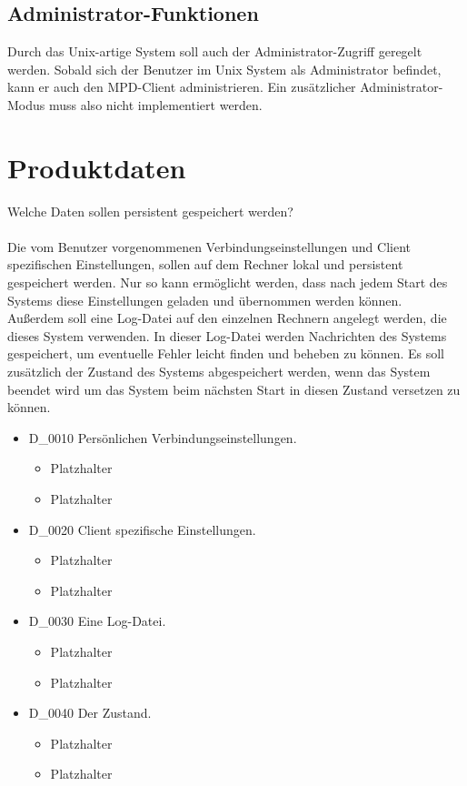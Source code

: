 \subsection{Administrator-Funktionen}
Durch das Unix-artige System soll auch der Administrator-Zugriff geregelt werden. Sobald sich der Benutzer im Unix System
als Administrator befindet, kann er auch den MPD-Client administrieren. Ein zusätzlicher Administrator-Modus muss also
nicht implementiert werden.
\section{Produktdaten}
Welche Daten sollen persistent gespeichert werden?\ \\ \\
Die vom Benutzer vorgenommenen Verbindungseinstellungen und Client spezifischen Einstellungen,
sollen auf dem Rechner lokal und persistent gespeichert werden. Nur so kann ermöglicht werden,
dass nach jedem Start des Systems diese Einstellungen geladen und übernommen werden können.\ \\
Außerdem soll eine Log-Datei auf den einzelnen Rechnern angelegt werden, die dieses System
verwenden. In dieser Log-Datei werden Nachrichten des Systems gespeichert, um eventuelle Fehler
leicht finden und beheben zu können. Es soll zusätzlich der Zustand des Systems abgespeichert werden,
wenn das System beendet wird um das System beim nächsten Start in diesen Zustand versetzen zu können.
\begin{itemize}
	\item D\_0010 Persönlichen Verbindungseinstellungen.
	\begin{itemize}
		\item Platzhalter
		\item Platzhalter
	\end{itemize}
	\item D\_0020 Client spezifische Einstellungen.
	\begin{itemize}
		\item Platzhalter
		\item Platzhalter
	\end{itemize}
	\item D\_0030 Eine Log-Datei.
	\begin{itemize}
		\item Platzhalter
		\item Platzhalter
	\end{itemize}
	\item D\_0040 Der Zustand.
	\begin{itemize}
		\item Platzhalter
		\item Platzhalter
	\end{itemize}
\end{itemize}
